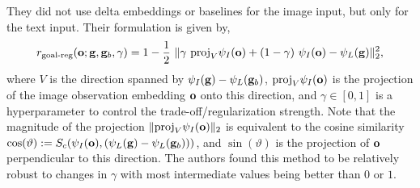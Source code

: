 They did not use delta embeddings or baselines for the image input, but only for the text input.
Their formulation is given by,
\begin{equation}
    \label{eq:vlmrm}
    r_{\text{goal-reg}}(\bfo; \bfg, \bfg_b, \gamma) = 1 - \dfrac{1}{2}\ \norm{\gamma\ \text{proj}_{V}\psi_I(\bfo) + (1 - \gamma)\ \psi_I(\bfo) - \psi_L(\bfg)}^2_2,
\end{equation}
where \(V\) is the direction spanned by \(\psi_I(\mathbf{g}) - \psi_L(\mathbf{g}_b)\), \(\text{proj}_{V}\psi_I(\mathbf{o})\) is the projection of the image observation embedding \(\mathbf{o}\) onto this direction, and \(\gamma \in [0, 1]\) is a hyperparameter to control the trade-off/regularization strength.
Note that the magnitude of the projection \(\lVert\text{proj}_{V}\psi_I(\mathbf{o})\rVert_2\) is equivalent to the cosine similarity \(\cos(\vartheta) := S_c(\psi_I(\mathbf{o}), (\psi_L(\mathbf{g}) - \psi_L(\mathbf{g}_b)))\), and \(\sin(\vartheta)\) is the projection of \(\mathbf{o}\) perpendicular to this direction.
The authors found this method to be relatively robust to changes in \(\gamma\) with most intermediate values being better than \(0\) or \(1\).
% 
\vspace{-1.5pt}
